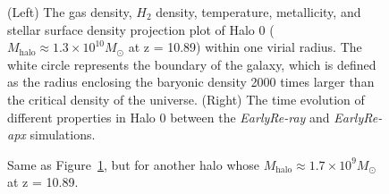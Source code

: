 \documentclass[linenumbers, twocolumn]{aastex631}
\begin{document}
\begin{figure}
	\caption{(Left) The gas density, $H_{2}$ density, temperature, metallicity, and stellar surface density projection plot of Halo 0 ($M_{\mathrm{halo}} \approx 1.3\times 10^{10} M_\odot$ at z = 10.89) within one virial radius. The white circle represents the boundary of the galaxy, which is defined as the radius enclosing the baryonic density 2000 times larger than the critical density of the universe. (Right) The time evolution of different properties in Halo 0 between the \textit{EarlyRe-ray} and \textit{EarlyRe-apx} simulations.}
	\label{fig:Halo0-0_comparison}
\end{figure}

\begin{figure}
	\caption{Same as Figure~\ref{fig:Halo0-0_comparison}, but for another halo whose $M_{\mathrm{halo}} \approx 1.7\times 10^{9} M_\odot$ at z = 10.89.}
	\label{fig:Halo8-9_comparison}
\end{figure}
\end{document}

